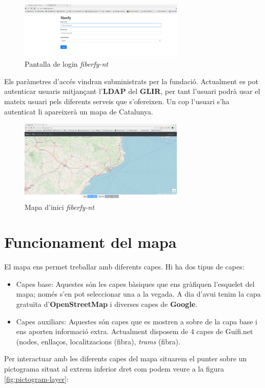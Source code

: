 \documentclass[a4paper]{article}
\begin{document}
	\begin{figure}[H]
		\centering
		\includegraphics[width=0.7\textwidth]{images/login_screen.png}
		\caption{Pantalla de login \emph{fiberfy-nt}}
	\end{figure}

	Els paràmetres d'accés vindran subministrats per la fundació. Actualment es pot autenticar usuaris mitjançant l'\textbf{LDAP} del \textbf{GLIR}, per tant l'usuari podrà usar el mateix usuari pels diferents serveis que s'ofereixen. Un cop l'usuari s'ha autenticat li apareixerà un mapa de Catalunya.
	
	\begin{figure}[H]
		\centering
		\includegraphics[width=0.7\textwidth]{images/map_screen.png}
		\caption{Mapa d'inici \emph{fiberfy-nt}}
	\end{figure}

	\section{Funcionament del mapa}
	El mapa ens permet treballar amb diferents capes. Hi ha dos tipus de capes:
	\begin{itemize}
		\item Capes base: Aquestes són les capes bàsiques que ens gràfiquen l'esquelet del mapa; només s'en pot seleccionar una a la vegada. A dia d'avui tenim la capa gratuïta d'\textbf{OpenStreetMap} i diverses capes de \textbf{Google}.
		\item Capes auxiliars: Aquestes són capes que es mostren a sobre de la capa base i ens aporten informació extra. Actualment disposem de 4 capes de Guifi.net (nodes, enllaços, localitzacions (fibra), \emph{trams} (fibra).
	\end{itemize}
	Per interactuar amb les diferents capes del mapa situarem el punter sobre un pictograma situat al extrem inferior dret com podem veure a la figura \ref{fig:pictogram-layer}:
	
\end{document}
